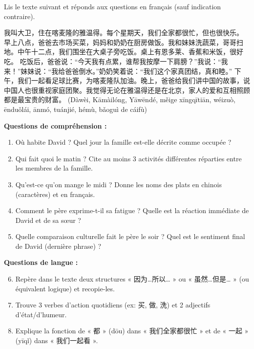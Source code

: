 \documentclass[11pt]{article}
\newcounter{popsec}
\newcounter{popsub}
\newcommand{\courssub}[1]{%
  \stepcounter{popsub}%
  \par\vspace{9pt}\noindent{\popxbold\fontsize{11.5}{13}\selectfont\color{popink}{\color{poporange}\thepopsec.\thepopsub}\hspace{6pt}#1}\par\nopagebreak\vspace{4pt}
}
\begin{document}
\courssub{Je me prépare au Bac}

\begin{exercice}
Lis le texte suivant et réponds aux questions en français (sauf indication contraire).

\begin{textebox}
我叫大卫，住在喀麦隆的雅温得。每个星期天，我们全家都很忙，但也很快乐。
早上八点，爸爸去市场买菜，妈妈和奶奶在厨房做饭。我和妹妹洗蔬菜，哥哥扫地。中午十二点，我们围坐在大桌子旁吃饭。桌上有恩多莱、香蕉和米饭，很好吃。
吃饭后，爸爸说：“今天我有点累，谁帮我按摩一下肩膀？”我说：“我来！”妹妹说：“我给爸爸倒水。”奶奶笑着说：“我们这个家真团结，真和睦。”
下午，我们一起看足球比赛，为喀麦隆队加油。晚上，爸爸给我们讲中国的故事，说中国人也很重视家庭团聚。我觉得无论在雅温得还是在北京，家人的爱和互相照顾都是最宝贵的财富。
(Dàwèi, Kāmàilóng, Yāwēndé, měige xīngqītiān, wéizuò, ēnduǒlái, ānmó, tuánjié, hémù, bǎoguì de cáifù)
\end{textebox}

\textbf{Questions de compréhension :}
\begin{enumerate}
    \item Où habite David ? Quel jour la famille est-elle décrite comme occupée ?
    \item Qui fait quoi le matin ? Cite au moins 3 activités différentes réparties entre les membres de la famille.
    \item Qu'est-ce qu'on mange le midi ? Donne les noms des plats en chinois (caractères) et en français.
    \item Comment le père exprime-t-il sa fatigue ? Quelle est la réaction immédiate de David et de sa sœur ?
    \item Quelle comparaison culturelle fait le père le soir ? Quel est le sentiment final de David (dernière phrase) ?
\end{enumerate}

\textbf{Questions de langue :}
\begin{enumerate}
    \setcounter{enumi}{5}
    \item Repère dans le texte deux structures « 因为…所以… » ou « 虽然…但是… » (ou équivalent logique) et recopie-les.
    \item Trouve 3 verbes d'action quotidiens (ex: 买, 做, 洗) et 2 adjectifs d'état/d'humeur.
    \item Explique la fonction de « 都 » (dōu) dans « 我们全家都很忙 » et de « 一起 » (yīqǐ) dans « 我们一起看 ».
\end{enumerate}
\end{exercice}
\end{document}
